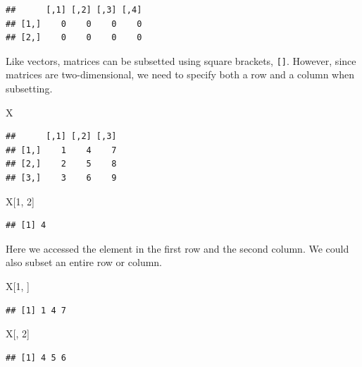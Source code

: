 \documentclass[]{book}
\newenvironment{Shaded}{\begin{snugshade}}{\end{snugshade}}
\newcommand{\DecValTok}[1]{\textcolor[rgb]{0.00,0.00,0.81}{#1}}
\newcommand{\NormalTok}[1]{#1}
\begin{document}
\begin{verbatim}
##      [,1] [,2] [,3] [,4]
## [1,]    0    0    0    0
## [2,]    0    0    0    0
\end{verbatim}

Like vectors, matrices can be subsetted using square brackets,
\texttt{{[}{]}}. However, since matrices are two-dimensional, we need to
specify both a row and a column when subsetting.

\begin{Shaded}
\begin{Highlighting}[]
\NormalTok{X}
\end{Highlighting}
\end{Shaded}

\begin{verbatim}
##      [,1] [,2] [,3]
## [1,]    1    4    7
## [2,]    2    5    8
## [3,]    3    6    9
\end{verbatim}

\begin{Shaded}
\begin{Highlighting}[]
\NormalTok{X[}\DecValTok{1}\NormalTok{, }\DecValTok{2}\NormalTok{]}
\end{Highlighting}
\end{Shaded}

\begin{verbatim}
## [1] 4
\end{verbatim}

Here we accessed the element in the first row and the second column. We
could also subset an entire row or column.

\begin{Shaded}
\begin{Highlighting}[]
\NormalTok{X[}\DecValTok{1}\NormalTok{, ]}
\end{Highlighting}
\end{Shaded}

\begin{verbatim}
## [1] 1 4 7
\end{verbatim}

\begin{Shaded}
\begin{Highlighting}[]
\NormalTok{X[, }\DecValTok{2}\NormalTok{]}
\end{Highlighting}
\end{Shaded}

\begin{verbatim}
## [1] 4 5 6
\end{verbatim}
\end{document}
